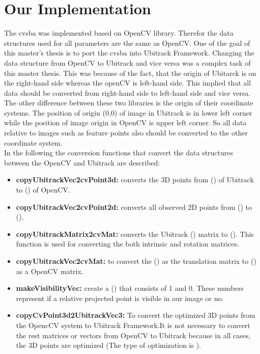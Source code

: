 \section{Our Implementation}
The cvsba was implemented based on OpenCV library. Therefor the data structures used for all parameters are the same as OpenCV. One of the goal of this master's thesis is to port the cvsba into Ubitrack Framework. Changing the data structure from OpenCV to Ubitrack and vice versa was a complex task of this master thesis. This was because of the fact, that the origin of Ubitarck is on the right-hand side whereas the openCV is left-hand side. This implied that all data should be converted from right-hand side to left-hand side and vice versa. The other difference between these two libraries is the origin of their coordinate systems. The position of origin (0,0) of image in Ubitrack is in lower left corner while the position of image origin in OpenCV is upper left corner. So all data relative to images such as feature points also should be converted to the other coordinate system.\\
In the following the conversion functions that convert the data structures between the OpenCV and Ubitrack are described:
\begin{itemize}
\item \textbf{copyUbitrackVec2cvPoint3d:} converts the 3D points from  () of Ubitrack to () of OpenCV. 
\item \textbf{copyUbitrackVec2cvPoint2d:} converts all observed 2D points from () to ().
\item \textbf{copyUbitrackMatrix2cvMat:} converts the Ubitrack () matrix to (). This function is used for converting the both intrinsic and rotation matrices.
\item \textbf{copyUbitrackVec2cvMat:} to convert the () as the translation matrix to () as a OpenCV matrix.
\item \textbf{makeVisibilityVec:} create a () that consists of 1 and 0. These numbers represent if a relative projected point is visible in our image or no.
\item \textbf{copyCvPoint3d2UbitrackVec3:} To convert the optimized 3D points from the OpencCV system to Ubitrack Framework.It is not necessary to convert the rest matrices or vectors from OpenCV to Ubitrack because in all cases, the 3D points are optimized (The type of optimization is ).
\end{itemize}

